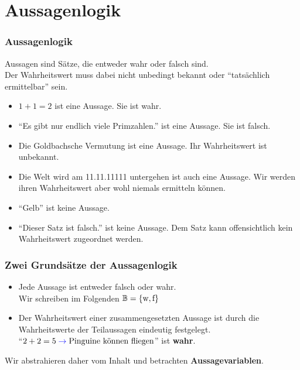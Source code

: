\section{Aussagenlogik}

\begin{frame}
	\frametitle{Aussagenlogik}
	Aussagen sind Sätze, die entweder wahr oder falsch sind.\\
	Der Wahrheitswert muss dabei nicht unbedingt bekannt oder \enquote{tatsächlich ermittelbar} sein.
	
	\pause
	\begin{Beispiel}
		\begin{itemize}
			\item $ 1 + 1 = 2 $ ist eine Aussage. Sie ist wahr.
			\item \enquote{Es gibt nur endlich viele Primzahlen.} ist eine Aussage. Sie ist falsch.
			\pause
			\item Die Goldbachsche Vermutung ist eine Aussage. Ihr Wahrheitswert ist unbekannt.
			\pause
			\item Die Welt wird am 11.11.11111 untergehen ist auch eine Aussage. Wir werden ihren Wahrheitswert aber wohl niemals ermitteln können.
			\pause
			\item \enquote{Gelb} ist keine Aussage.
			\pause
			\item \enquote{Dieser Satz ist falsch.} ist keine Aussage. Dem Satz kann offensichtlich kein Wahrheitswert zugeordnet werden.
		\end{itemize}
	\end{Beispiel}
\end{frame}

\begin{frame}
	\frametitle{Zwei Grundsätze der Aussagenlogik}
	
	\begin{itemize}
		\pause
		\item Jede Aussage ist entweder falsch oder wahr.\\
		Wir schreiben im Folgenden $\mathbb{B}= \{\text{w}, \text{f}\}$
		\pause
		\item Der Wahrheitswert einer zusammengesetzten Aussage ist durch die
		Wahrheitswerte der Teilaussagen eindeutig festgelegt. \\
		\enquote{$2 + 2 = 5 \; \textcolor{blue}{\to}\text{} \; \text{Pinguine können fliegen}$} ist \textbf{wahr}.\\[0.2em]
	\end{itemize}

	Wir abstrahieren daher vom Inhalt und betrachten \textbf{Aussagevariablen}.
\end{frame}

